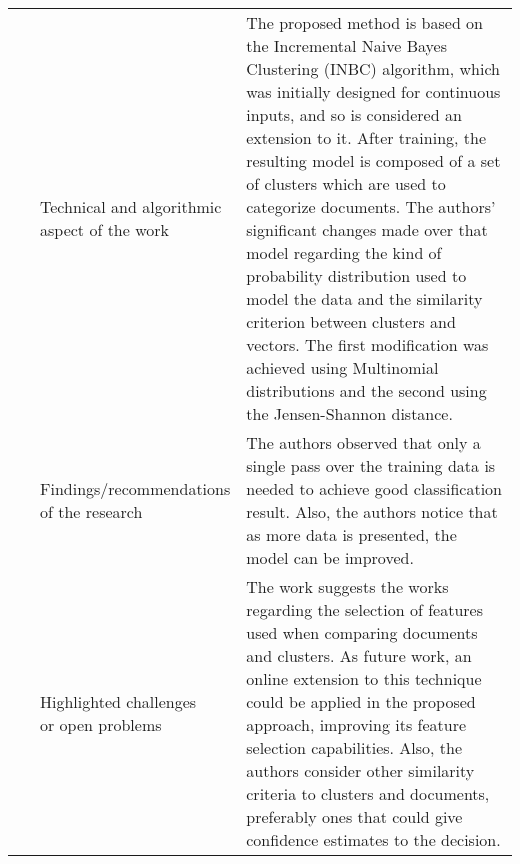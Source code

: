 \begin{landscape}
\begin{longtable}{lp{}p{}}
	\multirow{3}[0]{*}{~\citep{Rodrigues2014}} & 
    \specialcell{Technical and algorithmic \\ aspect of the work} &
	The proposed method is based on the Incremental Naive Bayes Clustering (INBC) algorithm, which was initially designed for continuous inputs, and so is considered an extension to it. After training, the resulting model is composed of a set of clusters which are used to categorize documents. The authors' significant changes made over that model regarding the kind of probability distribution used to model the data and the similarity criterion between clusters and vectors. The first modification was achieved using Multinomial distributions and the second using the Jensen-Shannon distance.     
    \\ & 
    \specialcell{Findings/recommendations \\ of the research} & 
	The authors observed that only a single pass over the training data is needed to achieve good classification result. Also, the authors notice that as more data is presented, the model can be improved.
    \\ & 
    \specialcell{Highlighted challenges \\ or open problems} & 
    The work suggests the works regarding the selection of features used when comparing documents and clusters. As future work, an online extension to this technique could be applied in the proposed approach, improving its feature selection capabilities.  Also, the authors consider other similarity criteria to clusters and documents, preferably ones that could give confidence estimates to the decision.
	\\
	

\end{longtable}
\end{landscape}
